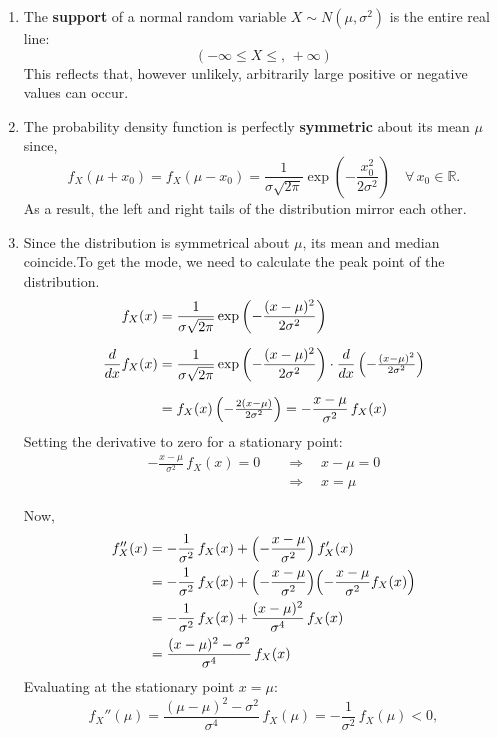 \documentclass[twoside]{book}
\begin{document}
\begin{enumerate}
  \item The \textbf{support} of a normal random variable \(X \sim N(\mu,\sigma^2)\) is the entire real line:
    \[
	(-\infty \leq X \leq,\,+\infty)
    \]
    This reflects that, however unlikely, arbitrarily large positive or negative values can occur.
    
  \item The probability density function is perfectly \textbf{symmetric} about its mean \(\mu\) since,
    \[
      f_X(\mu + x_0) = f_X(\mu - x_0) =  \frac{1}{\sigma\sqrt{2\pi }} \exp\left( -\frac{x_0^2}{2\sigma^2} \right)
      \quad\forall\,x_0\in\mathbb{R}.
    \]
    As a result, the left and right tails of the distribution mirror each other.
    
  \item Since the distribution is symmetrical about $\mu$, its mean and median coincide.To get the mode, we need to calculate the peak point of the distribution.
  \begin{align*}
  f_X(x) &= \frac{1}{\sigma\sqrt{2\pi}} \exp\left( -\frac{(x-\mu)^2}{2\sigma^2}\right)  \\[6pt]
  \frac{d}{dx}f_X(x)
  &= \frac{1}{\sigma\sqrt{2\pi}} \exp\left( -\frac{(x-\mu)^2}{2\sigma^2}\right)
     \cdot \frac{d}{dx}\left( -\tfrac{(x-\mu)^2}{2\sigma^2}\right)  \\[6pt]
  &= f_X(x)\,\Bigl(-\tfrac{2(x-\mu)}{2\sigma^2}\Bigr)
  = -\frac{x-\mu}{\sigma^2}\,f_X(x)
  \end{align*}
  Setting the derivative to zero for a stationary point:
  \begin{align*}
  -\frac{x-\mu}{\sigma^2}\,f_X(x) = 0
  \quad &\Longrightarrow\quad x - \mu = 0 \\[4pt]
  &\Longrightarrow\quad x = \mu
  \end{align*}
  
  Now, 
  \begin{align*}
  f_X''(x)
  &= -\frac{1}{\sigma^2}\,f_X(x)
     + \Bigl(-\frac{x-\mu}{\sigma^2}\Bigr)\,f_X'(x)
  \\
  &= -\frac{1}{\sigma^2}\,f_X(x)
     + \Bigl(-\frac{x-\mu}{\sigma^2}\Bigr)\Bigl(-\frac{x-\mu}{\sigma^2}f_X(x)\Bigr)
  \\
  &= -\frac{1}{\sigma^2}\,f_X(x)
     + \frac{(x-\mu)^2}{\sigma^4}\,f_X(x)
  \\
  &= \frac{(x-\mu)^2 - \sigma^2}{\sigma^4}\,f_X(x)
  \end{align*}
  Evaluating at the stationary point \(x=\mu\):
  \[
  f_X''(\mu)
  = \frac{(\mu-\mu)^2 - \sigma^2}{\sigma^4}\,f_X(\mu)
  = -\frac{1}{\sigma^2}\,f_X(\mu)
  < 0,
  \]
  

\end{enumerate}
\end{document}
